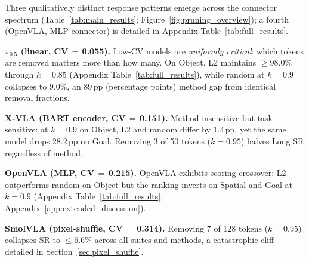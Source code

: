 Three qualitatively distinct response patterns emerge across the connector spectrum (Table~\ref{tab:main_results}; Figure~\ref{fig:pruning_overview}); a fourth (OpenVLA, MLP connector) is detailed in Appendix Table~\ref{tab:full_results}.

\textbf{$\pi_{0.5}$ (linear, CV$\,{=}\,$0.055).} Low-CV models are \emph{uniformly critical}: which tokens are removed matters more than how many. On Object, L2 maintains ${\geq}$98.0\% through $k{=}0.85$ (Appendix Table~\ref{tab:full_results}), while random at $k{=}0.9$ collapses to 9.0\%, an 89\,pp (percentage points) method gap from identical removal fractions.

\textbf{X-VLA (BART encoder, CV$\,{=}\,$0.151).} Method-insensitive but task-sensitive: at $k{=}0.9$ on Object, L2 and random differ by 1.4\,pp, yet the same model drops 28.2\,pp on Goal. Removing 3 of 50 tokens ($k{=}0.95$) halves Long SR regardless of method.

\textbf{OpenVLA (MLP, CV$\,{=}\,$0.215).} OpenVLA exhibits scoring crossover: L2 outperforms random on Object but the ranking inverts on Spatial and Goal at $k{=}0.9$ (Appendix Table~\ref{tab:full_results}; Appendix~\ref{app:extended_discussion}).

\textbf{SmolVLA (pixel-shuffle, CV$\,{=}\,$0.314).} Removing 7 of 128 tokens ($k{=}0.95$) collapses SR to ${\leq}$6.6\% across all suites and methods, a catastrophic cliff detailed in Section~\ref{sec:pixel_shuffle}.

